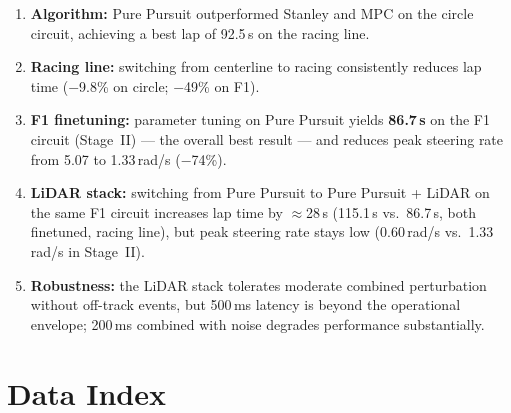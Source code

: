 \documentclass[11pt,a4paper]{article}
\newcommand{\best}[1]{\textbf{#1}}
\begin{document}
\begin{enumerate}
  \item \textbf{Algorithm:} Pure Pursuit outperformed Stanley and MPC on the circle
        circuit, achieving a best lap of 92.5\,s on the racing line.
  \item \textbf{Racing line:} switching from centerline to racing consistently reduces
        lap time ($-$9.8\% on circle; $-$49\% on F1).
  \item \textbf{F1 finetuning:} parameter tuning on Pure Pursuit yields
        \best{86.7\,s} on the F1 circuit (Stage~II) --- the overall best result ---
        and reduces peak steering rate from 5.07 to 1.33\,rad/s ($-$74\%).
  \item \textbf{LiDAR stack:} switching from Pure Pursuit to Pure Pursuit + LiDAR
        on the same F1 circuit increases lap time by $\approx$28\,s
        (115.1\,s vs.\ 86.7\,s, both finetuned, racing line), but peak steering
        rate stays low (0.60\,rad/s vs.\ 1.33\,rad/s in Stage~II).
  \item \textbf{Robustness:} the LiDAR stack tolerates moderate combined perturbation
        without off-track events, but 500\,ms latency is beyond the
        operational envelope; 200\,ms combined with noise degrades
        performance substantially.
\end{enumerate}

\appendix
\section{Data Index}
\label{app:data}
\end{document}
